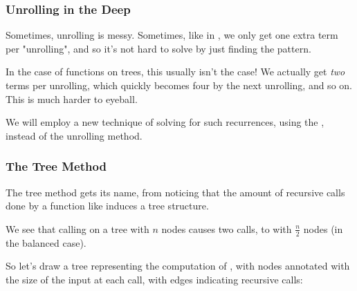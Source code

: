 \documentclass[aspectratio=169, handout]{beamer}
\begin{document}
\begin{frame}[fragile]
  \frametitle{Unrolling in the Deep}

  Sometimes, unrolling is messy. Sometimes, like in , we only get
  one extra term per "unrolling", and so it's not hard to solve by just 
  finding the pattern.

  \pause
  \vspace{\fill}
  
  In the case of functions on trees, this usually isn't the case! We actually
  get \textit{two} terms per unrolling, which quickly becomes four by the
  next unrolling, and so on. This is much harder to eyeball.

  \pause
  \vspace{\fill}

  We will employ a new technique of solving for such recurrences, using the
  , instead of the unrolling method.
\end{frame}

\begin{frame}[fragile]
  \frametitle{The Tree Method}

  \rprs

  The tree method gets its name, from noticing that the amount of recursive
  calls done by a function like  induces a tree structure.

  \pause
  \vspace{\fill}

  We see that calling  on a tree with $n$ nodes causes two
  calls, to  with $\frac{n}{2}$ nodes (in the balanced case).

  \pause
  \vspace{\fill}

  So let's draw a tree representing the computation of , with nodes 
  annotated with the size of the input at each call, with edges indicating 
  recursive calls:

  \pause
  \vspace{\fill}


\end{frame}
\end{document}
